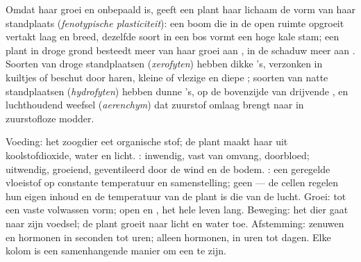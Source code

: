 \begin{proposition}\label{prop:b1:flowering-plant-organization:plasticity}
Omdat haar groei  en onbepaald is, geeft een plant haar lichaam de vorm
van haar standplaats (\emph{fenotypische plasticiteit}): een boom die in de open ruimte opgroeit vertakt laag en breed,
dezelfde soort in een bos vormt een hoge kale stam; een plant in droge grond
besteedt meer van haar groei aan , in de schaduw meer aan .
Soorten van droge standplaatsen (\emph{xerofyten}) hebben dikke
's,  verzonken in kuiltjes of beschut door haren, kleine of
vlezige  en diepe ; soorten van natte standplaatsen
(\emph{hydrofyten}) hebben dunne 's,  op de
bovenzijde van drijvende , en luchthoudend weefsel
(\emph{aerenchym}) dat zuurstof omlaag brengt naar  in
zuurstofloze modder.
\end{proposition}

\begin{example}\label{ex:b1:flowering-plant-organization:comparison}
Voeding: het zoogdier eet organische stof; de plant maakt haar uit
koolstofdioxide, water en licht. : inwendig, vast van
omvang, doorbloed; uitwendig, groeiend, geventileerd door de wind en de bodem.
: een geregelde vloeistof op constante temperatuur en samenstelling;
geen --- de cellen regelen hun eigen inhoud en de temperatuur van de plant is die
van de lucht. Groei: tot een vaste volwassen vorm; open en , het hele
leven lang. Beweging: het dier gaat naar zijn voedsel; de plant groeit naar licht
en water toe. Afstemming: zenuwen en hormonen in seconden tot uren; alleen
hormonen, in uren tot dagen. Elke kolom is een samenhangende manier om een  te zijn.
\end{example}

